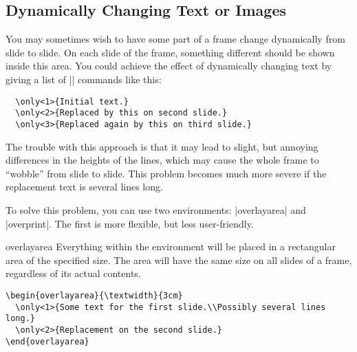 \subsection{Dynamically Changing Text or Images}

You may sometimes wish to have some part of a frame change dynamically from slide to slide. On each slide of the frame, something different should be shown inside this area. You could achieve the effect of dynamically changing text by giving a list of |\only| commands like this:
\begin{verbatim}
  \only<1>{Initial text.}
  \only<2>{Replaced by this on second slide.}
  \only<3>{Replaced again by this on third slide.}
\end{verbatim}

The trouble with this approach is that it may lead to slight, but annoying differences in the heights of the lines, which may cause the whole frame to ``wobble'' from slide to slide. This problem becomes much more severe if the replacement text is several lines long.

To solve this problem, you can use two environments: |overlayarea| and |overprint|. The first is more flexible, but less user-friendly.

\begin{environment}{{overlayarea}}
  Everything within the environment will be placed in a rectangular area of the specified size. The area will have the same size on all slides of a frame, regardless of its actual contents.

  \example
\begin{verbatim}
\begin{overlayarea}{\textwidth}{3cm}
  \only<1>{Some text for the first slide.\\Possibly several lines long.}
  \only<2>{Replacement on the second slide.}
\end{overlayarea}
\end{verbatim}

\end{environment}

